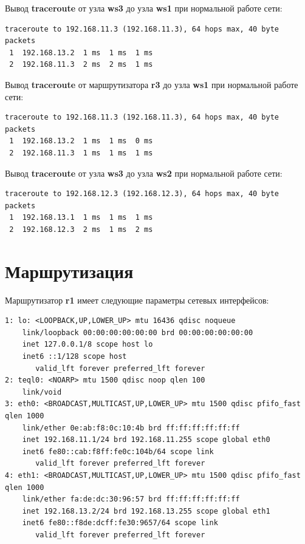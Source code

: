 \documentclass[a4paper,12pt]{article}
\begin{document}
Вывод \textbf{traceroute} от узла \textbf{ws3} до узла \textbf{ws1} при нормальной работе сети:

\begin{Verbatim}
traceroute to 192.168.11.3 (192.168.11.3), 64 hops max, 40 byte packets
 1  192.168.13.2  1 ms  1 ms  1 ms
 2  192.168.11.3  2 ms  2 ms  1 ms
\end{Verbatim}

Вывод \textbf{traceroute} от маршрутизатора \textbf{r3} до узла \textbf{ws1} при нормальной работе сети:

\begin{Verbatim}
traceroute to 192.168.11.3 (192.168.11.3), 64 hops max, 40 byte packets
 1  192.168.13.2  1 ms  1 ms  0 ms
 2  192.168.11.3  1 ms  1 ms  1 ms
\end{Verbatim}

Вывод \textbf{traceroute} от узла \textbf{ws3} до узла \textbf{ws2} при нормальной работе сети:

\begin{Verbatim}
traceroute to 192.168.12.3 (192.168.12.3), 64 hops max, 40 byte packets
 1  192.168.13.1  1 ms  1 ms  1 ms
 2  192.168.12.3  2 ms  1 ms  2 ms
\end{Verbatim}

\section{Маршрутизация}

Маршрутизатор \textbf{r1} имеет следующие параметры сетевых интерфейсов:

\begin{Verbatim}
1: lo: <LOOPBACK,UP,LOWER_UP> mtu 16436 qdisc noqueue 
    link/loopback 00:00:00:00:00:00 brd 00:00:00:00:00:00
    inet 127.0.0.1/8 scope host lo
    inet6 ::1/128 scope host 
       valid_lft forever preferred_lft forever
2: teql0: <NOARP> mtu 1500 qdisc noop qlen 100
    link/void 
3: eth0: <BROADCAST,MULTICAST,UP,LOWER_UP> mtu 1500 qdisc pfifo_fast qlen 1000
    link/ether 0e:ab:f8:0c:10:4b brd ff:ff:ff:ff:ff:ff
    inet 192.168.11.1/24 brd 192.168.11.255 scope global eth0
    inet6 fe80::cab:f8ff:fe0c:104b/64 scope link 
       valid_lft forever preferred_lft forever
4: eth1: <BROADCAST,MULTICAST,UP,LOWER_UP> mtu 1500 qdisc pfifo_fast qlen 1000
    link/ether fa:de:dc:30:96:57 brd ff:ff:ff:ff:ff:ff
    inet 192.168.13.2/24 brd 192.168.13.255 scope global eth1
    inet6 fe80::f8de:dcff:fe30:9657/64 scope link 
       valid_lft forever preferred_lft forever
\end{Verbatim}
\end{document}
